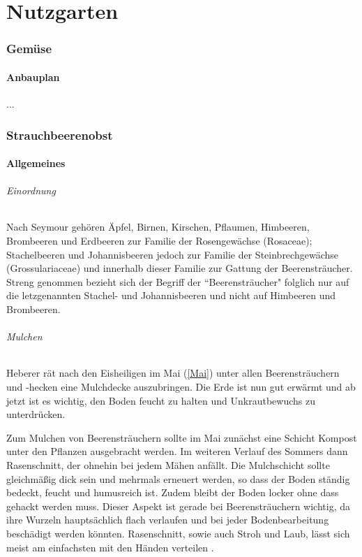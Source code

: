 \part{Nutzgarten}

\pagebreak

\section{Gemüse}

\subsection{Anbauplan}
...

\pagebreak

\section{Strauchbeerenobst}
\label{Strauchbeerenobst}

\subsection{Allgemeines}
\label{Strauchbeerenobst_allgemein}

\paragraph{Einordnung} 

Nach Seymour \cite[S.~168]{Seymour1978} gehören Äpfel, Birnen, Kirschen, Pflaumen, Himbeeren, Brombeeren und Erdbeeren zur Familie der Rosengewächse (Rosaceae);
Stachelbeeren und Johannisbeeren jedoch zur Familie der Steinbrechgewächse (Grossulariaceae) und innerhalb dieser Familie zur Gattung der Beerensträucher.
Streng genommen bezieht sich der Begriff der ``Beerensträucher" folglich nur auf die letzgenannten Stachel- und Johannisbeeren und nicht auf Himbeeren und Brombeeren.

\paragraph{Mulchen}

Heberer \cite[S.~44]{Heberer2018} rät nach den Eisheiligen im \textrightarrow Mai (\ref{Mai}) unter allen Beerensträuchern und -hecken eine Mulchdecke auszubringen.
Die Erde ist nun gut erwärmt und ab jetzt ist es wichtig, den Boden feucht zu halten und Unkrautbewuchs zu unterdrücken.

Zum Mulchen von Beerensträuchern sollte im Mai zunächst eine Schicht Kompost unter den Pflanzen ausgebracht werden.
Im weiteren Verlauf des Sommers dann Rasenschnitt, der ohnehin bei jedem Mähen anfällt.
Die Mulchschicht sollte gleichmäßig dick sein und mehrmals erneuert werden, so dass der Boden ständig bedeckt, feucht und humusreich ist.
Zudem bleibt der Boden locker ohne dass gehackt werden muss.
Dieser Aspekt ist gerade bei Beerensträuchern wichtig, da ihre Wurzeln hauptsächlich flach verlaufen und bei jeder Bodenbearbeitung beschädigt werden könnten.
Rasenschnitt, sowie auch Stroh und Laub, lässt sich meist am einfachsten mit den Händen verteilen \cite[S.~45]{Heberer2018}.

